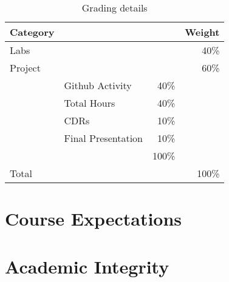 \documentclass[11pt]{article}
\begin{document}
\begin{table}[htb]
  \centering
  \begin{tabular}{llrr}
    \toprule
    Category &                    &       & Weight \\
    \midrule
    Labs     &                    &       & 40\%   \\
    Project  &                    &       & 60\%   \\
             & Github Activity    & 40\%  &        \\
             & Total Hours        & 40\%  &        \\
             & CDRs               & 10\%  &        \\
             & Final Presentation & 10\%  &        \\
             &                    & 100\% &        \\
    \midrule
    Total    &                    &       & 100\%  \\
    \bottomrule
  \end{tabular}
  \caption{Grading details}
  \label{tab:grading}
\end{table}
\begin{comment}
#+ORGTBL: SEND grades orgtbl-to-latex :splice nil :skip 0 :booktabs t
| Category |                    |      | Weight |
|          |                    |  <r> |    <r> |
|----------+--------------------+------+--------|
| Labs     |                    |      |    40%
| Project  |                    |      |    60%
|          | Github Activity    |  40%
|          | Total Hours        |  40%
|          | CDRs               |  10%
|          | Final Presentation |  10%
|          |                    | 100%
|----------+--------------------+------+--------|
| Total    |                    |      |   100%
\end{comment}

\section{Course Expectations}



\section{Academic Integrity}



\printbibliography{}
\end{document}
